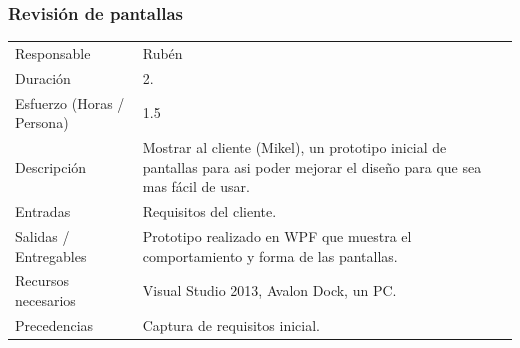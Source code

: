 \subsubsection{Revisi\'{o}n de pantallas}
\begin{table}[H]
    \begin{center}
        \begin{tabular}{l p{8cm}}
            Responsable                           & Rub\'{e}n \\
            Duraci\'{o}n                          & 2. \\ 
            Esfuerzo (Horas / Persona)            & 1.5 \\
            Descripci\'{o}n                       & Mostrar al cliente (Mikel), un prototipo inicial de pantallas
                                                    para asi poder mejorar el dise\~{n}o para que sea mas f\'{a}cil de usar. \\
            Entradas                              & Requisitos del cliente. \\
            Salidas / Entregables                 & Prototipo realizado en WPF que muestra el comportamiento y forma de las pantallas. \\
            Recursos necesarios                   & Visual Studio 2013, Avalon Dock, un PC. \\
            Precedencias                          & Captura de requisitos inicial. \\
        \end{tabular}
    \end{center}
    
\end{table}

